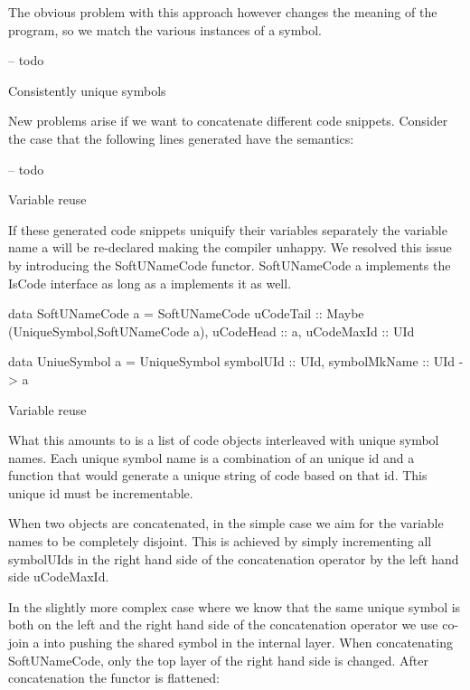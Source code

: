 The obvious problem with this approach however changes the meaning of
the program, so we match the various instances of a symbol.

\begin{code}
\begin{haskellcode}
-- todo
\end{haskellcode}
\caption{Consistently unique symbols}
\end{code}

New problems arise if we want to concatenate different code
snippets. Consider the case that the following lines generated have
the semantics:


\begin{code}
\begin{haskellcode}
-- todo
\end{haskellcode}
\caption{Variable reuse}
\end{code}

If these generated code snippets uniquify their variables separately
the variable name a will be re-declared making the compiler
unhappy. We resolved this issue by introducing the SoftUNameCode
functor. SoftUNameCode a implements the IsCode interface as long as a
implements it as well.

\begin{code}
\begin{haskellcode}
data SoftUNameCode a = SoftUNameCode {
  uCodeTail :: Maybe (UniqueSymbol,SoftUNameCode a),
  uCodeHead :: a,
  uCodeMaxId :: UId
  }

data UniueSymbol a = UniqueSymbol {
  symbolUId :: UId,
  symbolMkName :: UId -> a
  }
\end{haskellcode}
\caption{Variable reuse}
\end{code}

What this amounts to is a list of code objects interleaved with unique
symbol names. Each unique symbol name is a combination of an unique id
and a function that would generate a unique string of code based on
that id. This unique id must be incrementable.


When two  objects are concatenated, in the simple case
we aim for the variable names to be completely disjoint. This is
achieved by simply incrementing all symbolUIds in the right hand side
of the concatenation operator by the left hand side uCodeMaxId.

In the slightly more complex case where we know that the same unique
symbol is both on the left and the right hand side of the
concatenation operator we use co-join  a into
 pushing the shared symbol in the
internal layer. When concatenating SoftUNameCode, only the top layer
of the right hand side is changed. After concatenation the functor is
flattened:

